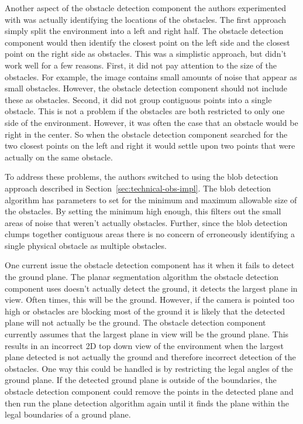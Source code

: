 Another aspect of the obstacle detection component the authors experimented with
was actually identifying the locations of the obstacles. The first approach
simply split the environment into a left and right half. The obstacle detection
component would then identify the closest point on the left side and the
closest point on the right side as obstacles. This was a simplistic approach,
but didn't work well for a few reasons. First, it did not pay attention to the
size of the obstacles. For example, the image contains small amounts of noise
that appear as small obstacles. However, the obstacle detection component should
not include these as obstacles. Second, it did not group contiguous points into
a single obstacle. This is not a problem if the obstacles are both restricted to
only one side of the environment. However, it was often the case that an
obstacle would be right in the center. So when the obstacle detection component
searched for the two closest points on the left and right it would settle upon
two points that were actually on the same obstacle.

To address these problems, the authors switched to using the blob detection
approach described in Section~\ref{sec:technical-obs-impl}. The blob detection
algorithm has parameters to set for the minimum and maximum allowable size of
the obstacles. By setting the minimum high enough, this filters out the
small areas of noise that weren't actually obstacles. Further, since the blob
detection clumps together contiguous areas there is no concern of erroneously
identifying a single physical obstacle as multiple obstacles.

One current issue the obstacle detection component has it when it fails to
detect the ground plane. The planar segmentation algorithm the obstacle
detection component uses doesn't actually detect the ground, it detects the
largest plane in view. Often times, this will be the ground. However, if the
camera is pointed too high or obstacles are blocking most of the ground it is
likely that the detected plane will not actually be the ground. The obstacle
detection component currently assumes that the largest plane in view will be the
ground plane. This results in an incorrect 2D top down view of the environment
when the largest plane detected is not actually the ground and therefore
incorrect detection of the obstacles. One way this could be handled is by
restricting the legal angles of the ground plane. If the detected ground plane
is outside of the boundaries, the obstacle detection component could remove the
points in the detected plane and then run the plane detection algorithm again
until it finds the plane within the legal boundaries of a ground plane.


